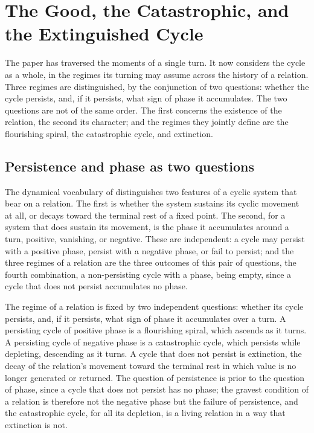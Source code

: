 \section{The Good, the Catastrophic, and the Extinguished Cycle}
\label{p11:sec:regimes}

\noindent
The paper has traversed the moments of a single turn. It now considers the cycle as a whole, in the regimes its turning may assume across the history of a relation. Three regimes are distinguished, by the conjunction of two questions: whether the cycle persists, and, if it persists, what sign of phase it accumulates. The two questions are not of the same order. The first concerns the existence of the relation, the second its character; and the regimes they jointly define are the flourishing spiral, the catastrophic cycle, and extinction.

\subsection{Persistence and phase as two questions}
\label{p11:sec:reg-two}

The dynamical vocabulary of  distinguishes two features of a cyclic system that bear on a relation. The first is whether the system sustains its cyclic movement at all, or decays toward the terminal rest of a fixed point. The second, for a system that does sustain its movement, is the phase it accumulates around a turn, positive, vanishing, or negative. These are independent: a cycle may persist with a positive phase, persist with a negative phase, or fail to persist; and the three regimes of a relation are the three outcomes of this pair of questions, the fourth combination, a non-persisting cycle with a phase, being empty, since a cycle that does not persist accumulates no phase.

\begin{claim}
The regime of a relation is fixed by two independent questions: whether its cycle persists, and, if it persists, what sign of phase it accumulates over a turn. A persisting cycle of positive phase is a flourishing spiral, which ascends as it turns. A persisting cycle of negative phase is a catastrophic cycle, which persists while depleting, descending as it turns. A cycle that does not persist is extinction, the decay of the relation's movement toward the terminal rest in which value is no longer generated or returned. The question of persistence is prior to the question of phase, since a cycle that does not persist has no phase; the gravest condition of a relation is therefore not the negative phase but the failure of persistence, and the catastrophic cycle, for all its depletion, is a living relation in a way that extinction is not.
\end{claim}

